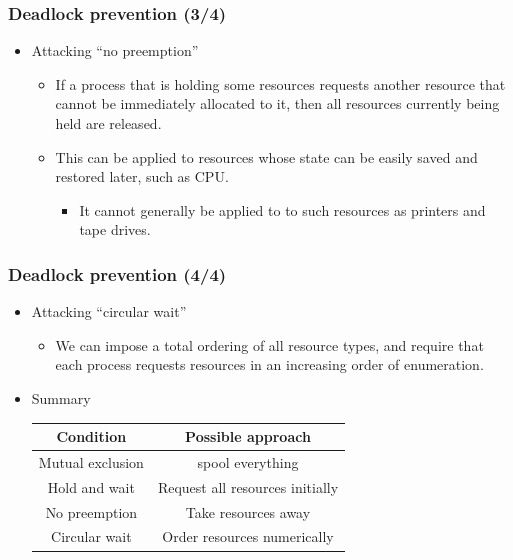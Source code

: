 \documentclass[CJKutf8,xcolor=pdftex,dvipsnames,table]{beamer}
\begin{document}
\begin{CJK*}{UTF8}{song}
  \begin{frame}
  \frametitle{Deadlock prevention (3/4)} \pause
  \begin{itemize}
  \item{Attacking ``no preemption''} \pause
    \begin{itemize}
    \item{If a process that is holding some resources requests another resource that cannot be immediately allocated to it, then all resources currently being held are released.} \pause
    \item{This can be applied to resources whose state can be easily saved and restored later, such as CPU.} \pause
      \begin{itemize}
      \item{It cannot generally be applied to to such resources as printers and tape drives.}
      \end{itemize}
    \end{itemize}
  \end{itemize}
  \end{frame}
  
  \begin{frame}
  \frametitle{Deadlock prevention (4/4)} \pause
  \begin{itemize}
  \item{Attacking ``circular wait''} \pause
    \begin{itemize}
    \item{We can impose a total ordering of all resource types, and require that each process requests resources in an increasing order of enumeration.} \pause
    \end{itemize}
  \item{Summary} \pause
    \newline
    \begin{center}
      \begin{tabular}{c|c}
        \textbf{Condition} & \textbf{Possible approach}\\
        \hline\hline \pause
        Mutual exclusion   & spool everything\\
        \hline \pause
        Hold and wait      & Request all resources initially\\
        \hline \pause
        No preemption      & Take resources away\\
        \hline \pause
        Circular wait      & Order resources numerically
      \end{tabular}
    \end{center}
  \end{itemize}
  \end{frame}
  

\end{CJK*}
\end{document}
